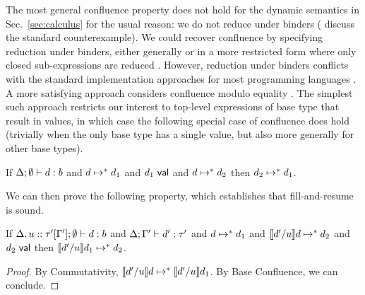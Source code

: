 The most general confluence property does not hold for the dynamic
semantics in Sec.~\ref{sec:calculus} for the usual reason: we do not
reduce under binders (\citet{DBLP:conf/birthday/BlancLM05} discuss the
standard counterexample).
%
We could recover confluence by specifying reduction under binders,
either generally or in a more restricted form where only closed
sub-expressions are
reduced \cite{DBLP:journals/tcs/CagmanH98,DBLP:conf/birthday/BlancLM05,levy1999explicit}.
%
However, reduction under binders conflicts with the standard implementation approaches
for most programming languages \cite{DBLP:conf/birthday/BlancLM05}.
%
A more satisfying approach considers confluence modulo equality \cite{Huet:1980ng}.
%
The simplest such approach restricts our interest to top-level expressions
of base type that result in values, in which case the following
special case of confluence does hold (trivially when the only base
type has a single value, but also more generally for other base
types).
\begin{lem}
  If $\Delta; \emptyset \vdash d : b$ and
  $d \mapsto^* d_1$
  and $d_1~\mathsf{val}$
  and $d \mapsto^* d_2$
  then $d_2 \mapsto^* d_1$.
\end{lem}
We can then prove the following property, which establishes that fill-and-resume is sound.
\begin{thm}[Resumption]
  If $\Delta, u :: \tau'[\Gamma']; \emptyset \vdash d : b$
  and $\Delta; \Gamma' \vdash d' : \tau'$
  and $d \mapsto^* d_1$
  and $\llbracket d' / u\rrbracket d \mapsto^* d_2$
  and $d_2~\mathsf{val}$
  then $\llbracket d' / u\rrbracket d_1 \mapsto^* d_2$.
  \begin{proof}
    By Commutativity,
    $\llbracket d' / u\rrbracket d \mapsto^* \llbracket d' / u\rrbracket d_1$.
    By Base Confluence, we can conclude.
  \end{proof}
\end{thm}
